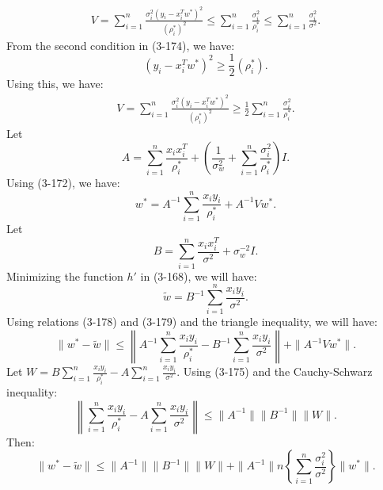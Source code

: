 	\begin{align}
		V = \sum_{i=1}^{n} \frac{\sigma_i^2 (y_i - x_i^T w^*)^2}{(\rho_i^*)^2} \le \sum_{i=1}^{n} \frac{\sigma_i^2}{\rho_i^*} \le \sum_{i=1}^{n} \frac{\sigma_i^2}{\sigma^2}.
	\end{align}
	From the second condition in (3-174), we have:
	\begin{equation}
		(y_i - x_i^T w^*)^2 \ge \frac{1}{2}(\rho_i^*).
	\end{equation}
	Using this, we have:
	\begin{align}
		V = \sum_{i=1}^{n} \frac{\sigma_i^2 (y_i - x_i^T w^*)^2}{(\rho_i^*)^2} \ge \frac{1}{2} \sum_{i=1}^{n} \frac{\sigma_i^2}{\rho_i^*}.
	\end{align}
	Let
	\begin{equation}
		A = \sum_{i=1}^{n} \frac{x_i x_i^T}{\rho_i^*} + \left( \frac{1}{\sigma_w^2} + \sum_{i=1}^{n} \frac{\sigma_i^2}{\rho_i^*} \right) I.
	\end{equation}
	Using (3-172), we have:
	\begin{equation}
		w^* = A^{-1} \sum_{i=1}^{n} \frac{x_i y_i}{\rho_i^*} + A^{-1} V w^*.
	\end{equation}
	Let
	\begin{equation}
		B = \sum_{i=1}^{n} \frac{x_i x_i^T}{\sigma^2} + \sigma_w^{-2} I.
	\end{equation}
	Minimizing the function $h'$ in (3-168), we will have:
	\begin{equation}
		\tilde{w} = B^{-1} \sum_{i=1}^{n} \frac{x_i y_i}{\sigma^2}.
	\end{equation}
	Using relations (3-178) and (3-179) and the triangle inequality, we will have:
	\begin{equation}
		\|w^* - \tilde{w}\| \le \left\| A^{-1} \sum_{i=1}^{n} \frac{x_i y_i}{\rho_i^*} - B^{-1} \sum_{i=1}^{n} \frac{x_i y_i}{\sigma^2} \right\| + \| A^{-1} V w^* \|.
	\end{equation}
	Let $W = B \sum_{i=1}^{n} \frac{x_i y_i}{\rho_i^*} - A \sum_{i=1}^{n} \frac{x_i y_i}{\sigma^2}$. Using (3-175) and the Cauchy-Schwarz inequality:
	\begin{equation}
		\left\| \sum_{i=1}^{n} \frac{x_i y_i}{\rho_i^*} - A \sum_{i=1}^{n} \frac{x_i y_i}{\sigma^2} \right\| \le \| A^{-1} \| \| B^{-1} \| \| W \|.
	\end{equation}
	Then:
	\begin{equation}
		\|w^* - \tilde{w}\| \le \|A^{-1}\| \|B^{-1}\| \|W\| + \|A^{-1}\| n \left\{ \sum_{i=1}^{n} \frac{\sigma_i^2}{\sigma^2} \right\} \|w^*\|.
	\end{equation}
